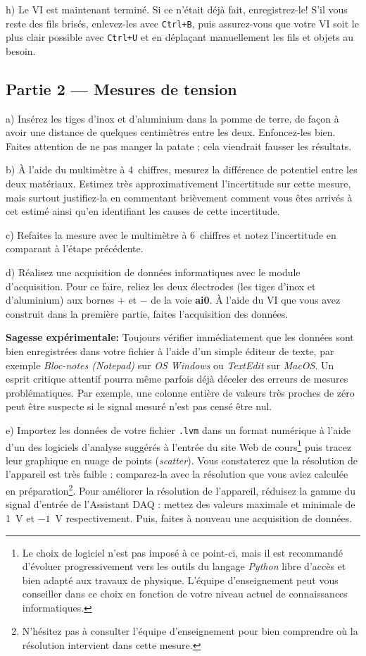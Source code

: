 \documentclass[canadien,12pt,oneside,letterpaper]{article}
\begin{document}
h) Le VI est maintenant terminé. Si ce n'était déjà fait, enregistrez-le! S'il vous reste des fils brisés, enlevez-les avec \texttt{Ctrl+B}, puis assurez-vous que votre VI soit le plus clair possible avec \texttt{Ctrl+U} et en déplaçant manuellement les fils et objets au besoin.


\subsection{Partie 2 --- Mesures de tension}

a) Insérez les tiges d'inox et d'aluminium dans la pomme de terre, de façon à avoir une distance de quelques centimètres entre les deux. Enfoncez-les bien. Faites attention de ne pas manger la patate ; cela viendrait fausser les résultats.

b) À l'aide du multimètre à 4\textonehalf~chiffres, mesurez la différence de potentiel entre les deux matériaux. Estimez très approximativement l'incertitude sur cette mesure, mais surtout justifiez-la en commentant brièvement comment vous êtes arrivés à cet estimé ainsi qu'en identifiant les causes de cette incertitude. 

c) Refaites la mesure avec le multimètre à 6\textonehalf~chiffres et notez l'incertitude en comparant à l'étape précédente.

d) Réalisez une acquisition de données informatiques avec le module d'acquisition. Pour ce faire, reliez les deux électrodes (les tiges d'inox et d'aluminium) aux bornes $+$ et $-$ de la voie \textbf{ai0}. À l'aide du VI que vous avez construit dans la première partie, faites l'acquisition des données.

\textbf{Sagesse expérimentale:} Toujours vérifier immédiatement que les données sont bien enregistrées dans votre fichier à l'aide d'un simple éditeur de texte, par exemple \textit{Bloc-notes (Notepad)} sur \textit{OS Windows} ou \textit{TextEdit} sur \textit{MacOS}. Un esprit critique attentif pourra même parfois déjà déceler des erreurs de mesures problématiques. Par exemple, une colonne entière de valeurs très proches de zéro peut être suspecte si le signal mesuré n'est pas censé être nul. 

e) Importez les données de votre fichier \texttt{.lvm} dans un format numérique à l'aide d'un des logiciels d'analyse suggérés à l'entrée du site Web de cours\footnote{Le choix de logiciel n'est pas imposé à ce point-ci, mais il est recommandé d'évoluer progressivement vers les outils du langage \textit{Python} libre d'accès et bien adapté aux travaux de physique. L'équipe d'enseignement peut vous conseiller dans ce choix en fonction de votre niveau actuel de connaissances informatiques.} puis tracez leur graphique en nuage de points (\textit{scatter}). Vous constaterez que la résolution de l'appareil est très faible : comparez-la avec la résolution que vous aviez calculée en préparation\footnote{N'hésitez pas à consulter l'équipe d'enseignement pour bien comprendre où la résolution intervient dans cette mesure.}. Pour améliorer la résolution de l'appareil, réduisez la gamme du signal d'entrée de l'Assistant DAQ : mettez des valeurs maximale et minimale de 1~V et $-1$~V respectivement. Puis, faites à nouveau une acquisition de données.
\end{document}
